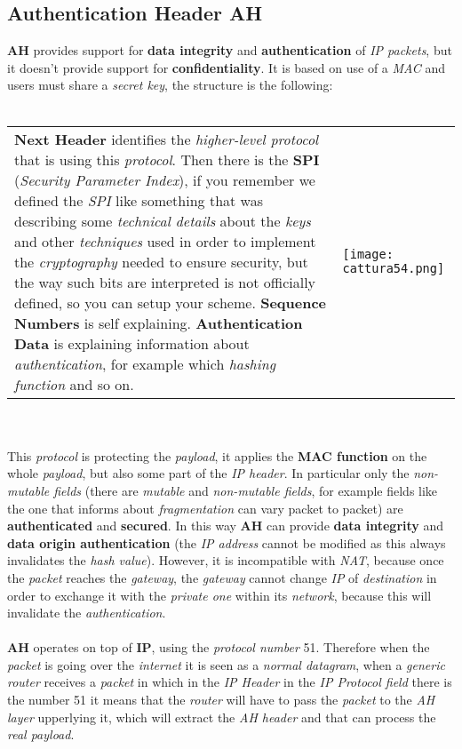 \documentclass{article}
\begin{document}
\subsection{Authentication Header AH}
\textbf{AH} provides support for \textbf{data integrity} and \textbf{authentication} of \emph{IP packets}, but it doesn't provide support for \textbf{confidentiality}. It is based on use of a \emph{MAC} and users must share a \emph{secret key}, the structure is the following:\\\\
\begin{tabular}{C{9cm}  L{10.5cm}}
\textbf{Next Header} identifies the \emph{higher-level protocol} that is using this \emph{protocol}. Then there is the \textbf{SPI} (\emph{Security Parameter Index}), if you remember we defined the \emph{SPI} like something that was describing some \emph{technical details} about the \emph{keys} and other \emph{techniques} used in order to implement the \emph{cryptography} needed to ensure security, but the way such bits are interpreted is not officially defined, so you can setup your scheme. \textbf{Sequence Numbers} is self explaining. \textbf{Authentication Data} is explaining information about \emph{authentication}, for example which \emph{hashing function} and so on. 
& \texttt{[image: cattura54.png]}
\end{tabular} \\\\
This \emph{protocol} is protecting the \emph{payload}, it applies the\textbf{ MAC function} on the whole \emph{payload}, but also some part of the \emph{IP header}. In particular only the \emph{non-mutable fields} (there are \emph{mutable} and \emph{non-mutable fields}, for example fields like the one that informs about \emph{fragmentation} can vary packet to packet) are \textbf{authenticated} and \textbf{secured}. In this way \textbf{AH} can provide \textbf{data integrity} and \textbf{data origin authentication} (the \emph{IP address} cannot be modified as this always invalidates the \emph{hash value}). However, it is incompatible with \emph{NAT}, because once the \emph{packet} reaches the \emph{gateway}, the \emph{gateway} cannot change \emph{IP} of \emph{destination} in order to exchange it with the \emph{private one} within its \emph{network}, because this will invalidate the \emph{authentication}. \\\\
\textbf{AH} operates on top of \textbf{IP}, using the \emph{protocol number} 51. Therefore when the \emph{packet} is going over the \emph{internet} it is seen as a \emph{normal datagram}, when a \emph{generic router} receives a \emph{packet} in which in the \emph{IP Header} in the \emph{IP Protocol field} there is the number 51 it means that the \emph{router} will have to pass the \emph{packet} to the \emph{AH layer} upperlying it, which will extract the\emph{ AH header} and that can process the \emph{real payload}. 
\end{document}
